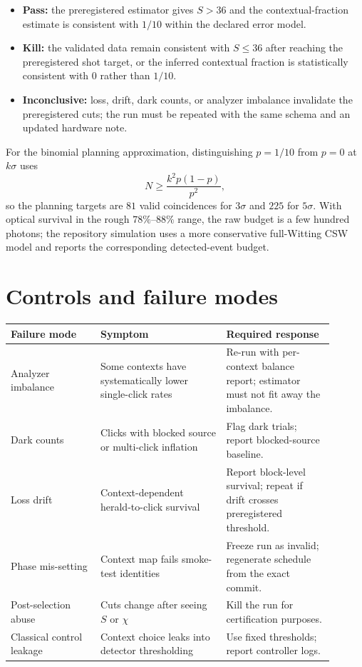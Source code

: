 \documentclass[11pt]{article}
\begin{document}
\begin{decisionbox}
\begin{itemize}[leftmargin=1.4em]
\item \textbf{Pass:} the preregistered estimator gives $S>36$ and the contextual-fraction estimate is
consistent with $1/10$ within the declared error model.
\item \textbf{Kill:} the validated data remain consistent with $S\le36$ after reaching the preregistered
shot target, or the inferred contextual fraction is statistically consistent with $0$ rather than $1/10$.
\item \textbf{Inconclusive:} loss, drift, dark counts, or analyzer imbalance invalidate the preregistered
cuts; the run must be repeated with the same schema and an updated hardware note.
\end{itemize}
\end{decisionbox}

For the binomial planning approximation, distinguishing $p=1/10$ from $p=0$ at $k\sigma$ uses
\[
  N\ge \frac{k^2p(1-p)}{p^2},
\]
so the planning targets are $81$ valid coincidences for $3\sigma$ and $225$ for $5\sigma$.  With optical
survival in the rough $78\%$--$88\%$ range, the raw budget is a few hundred photons; the repository
simulation uses a more conservative full-Witting CSW model and reports the corresponding detected-event
budget.

\section{Controls and failure modes}
\begin{longtable}{p{0.25\linewidth}p{0.35\linewidth}p{0.30\linewidth}}
\toprule
Failure mode & Symptom & Required response\\
\midrule
Analyzer imbalance & Some contexts have systematically lower single-click rates & Re-run with per-context balance report; estimator must not fit away the imbalance.\\
Dark counts & Clicks with blocked source or multi-click inflation & Flag dark trials; report blocked-source baseline.\\
Loss drift & Context-dependent herald-to-click survival & Report block-level survival; repeat if drift crosses preregistered threshold.\\
Phase mis-setting & Context map fails smoke-test identities & Freeze run as invalid; regenerate schedule from the exact commit.\\
Post-selection abuse & Cuts change after seeing $S$ or $\chi$ & Kill the run for certification purposes.\\
Classical control leakage & Context choice leaks into detector thresholding & Use fixed thresholds; report controller logs.\\
\bottomrule
\end{longtable}
\end{document}
